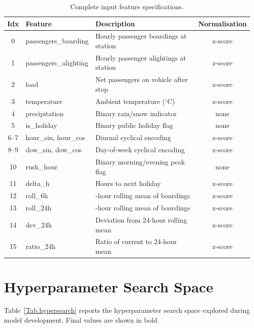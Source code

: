 \begin{table}[H]
\centering
\caption{Complete input feature specifications.}
\label{Tab.features}
\begin{tabular}{cl>{\raggedright\arraybackslash}p{4.5cm}c@{}}
\toprule
Idx & Feature & Description & Normalisation \\
\midrule
0 & passengers\_boarding & Hourly passenger boardings at station & z-score \\
1 & passengers\_alighting & Hourly passenger alightings at station & z-score \\
2 & load & Net passengers on vehicle after stop & z-score \\
3 & temperature & Ambient temperature ($^\circ$C) & z-score \\
4 & precipitation & Binary rain/snow indicator & none \\
5 & is\_holiday & Binary public holiday flag & none \\
6--7 & hour\_sin, hour\_cos & Diurnal cyclical encoding & z-score \\
8--9 & dow\_sin, dow\_cos & Day-of-week cyclical encoding & z-score \\
10 & rush\_hour & Binary morning/evening peak flag & none \\
11 & delta\_h & Hours to next holiday & z-score \\
12 & roll\_6h & 6-hour rolling mean of boardings & z-score \\
13 & roll\_24h & 24-hour rolling mean of boardings & z-score \\
14 & dev\_24h & Deviation from 24-hour rolling mean & z-score \\
15 & ratio\_24h & Ratio of current to 24-hour mean & z-score \\
\bottomrule
\end{tabular}
\end{table}

\section{Hyperparameter Search Space}
\label{app:hyperparams}

Table~\ref{Tab.hypersearch} reports the hyperparameter search space explored during model development. Final values are shown in bold.

